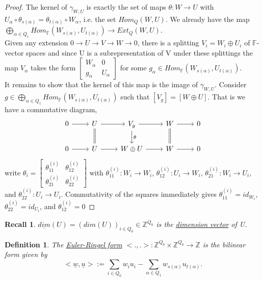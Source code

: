 \documentclass{book}
\newtheorem{definition}[theorem]{Definition}
\newtheorem* {recall*}{Recall}
\begin{document}
		\begin{proof}
			The kernel of $\gamma_{W,U}$ is exactly the set of maps $\theta :W \rightarrow U$ with $U_{\alpha} \circ \theta_{s(\alpha)} = \theta_{t(\alpha)} \circ W_{\alpha}$, i.e. the set $Hom_Q(W,U)$. We already have the map $\bigoplus_{\alpha \in Q_{1}} Hom_{\mathbb{F}} (W_{s(\alpha)},U_{t(\alpha)}) \rightarrow Ext_Q(W,U)$. \\ Given any extension $0 \rightarrow U \rightarrow V \rightarrow W \rightarrow 0$, there is a splitting $V_i= W_i \oplus U_i$ of $\mathbb{F}$-vector spaces and since U is a subrepresentation of V under these splittings the map $V_{\alpha}$ takes the form $\begin{bmatrix}W_{\alpha} & 0\\ g_{\alpha} & U_{\alpha} \end{bmatrix}$ for some $g_{\alpha} \in Hom_{\mathbb{F}}(W_{s(\alpha)}, U_{t(\alpha)}).$ \\ It remains to show that the kernel of this map is the image of $\gamma_{W,U}$. Consider $g \in \bigoplus_{\alpha \in Q_1} Hom_{\mathbb{F}}(W_{s(\alpha)},U_{t(\alpha)})$ such that $[V_g]=[W\oplus U]$. That is we have a commutative diagram,
		\[ \begin{tikzcd}
			0 \arrow{r} & U \arrow[equal]{d} \arrow{r}& V_g \arrow{r}\arrow{d}{\theta} & W  \arrow[equal]{d} \arrow{r} & 0 \\
			0 \arrow{r} & U \arrow{r} & W\oplus U \arrow{r} & W \arrow{r}& 0 
			\end{tikzcd}\]
write $\theta_i =\begin{bmatrix} \theta_{11}^{(i)} & \theta_{12}^{(i)}\\ \theta_{21}^{(i)} &\theta_{22}^{(i)} \end{bmatrix}$ with $\theta_{11}^{(i)}:W_i \rightarrow W_i$, $\theta_{12}^{(i)}:U_i \rightarrow W_i$, $\theta_{21}^{(i)}:W_i \rightarrow U_i$, and $\theta_{22}^{(i)}:U_i \rightarrow U_i$. Commutativity of the squares immediately gives $\theta_{11}^{(i)}=id_{W_i}$, $\theta_{22}^{(i)}=id_{U_i}$, and $\theta_{12}^{(i)}=0$
		\end{proof}

		\begin{recall*}
			$\underline{dim}(U) = (dim(U))_{i \in Q_0} \in \mathbb{Z}^{Q_0}$ is the \underline{dimension vector} of U. 
		\end{recall*}
		\begin{definition}
			The \underline{Euler-Ringel form} $<.,.>:\mathbb{Z}^{Q_0} \times \mathbb{Z}^{Q_0} \rightarrow \mathbb{Z}$ is the bilinear form given by $$\displaystyle{<\underline{w},\underline{u}>:= \sum_{i \in Q_0} w_i u_i - \sum_{\alpha \in Q_1} w_{s(\alpha)} u_{t(\alpha)}}.$$
		\end{definition}
\end{document}
